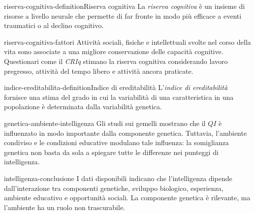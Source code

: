 \documentclass[preview]{standalone}
\begin{document}
\begin{snippetdefinition}{riserva-cognitiva-definition}{Riserva cognitiva}
    La \emph{riserva cognitiva} è un insieme di risorse a livello neurale che
    permette di far fronte in modo più efficace a eventi traumatici o al declino
    cognitivo.
\end{snippetdefinition}

\begin{snippet}{riserva-cognitiva-fattori}
    Attività sociali, fisiche e intellettuali svolte nel corso della vita sono
    associate a una migliore conservazione delle capacità cognitive. Questionari
    come il \emph{CRIq} stimano la riserva cognitiva considerando lavoro
    pregresso, attività del tempo libero e attività ancora praticate.
\end{snippet}

\begin{snippetdefinition}{indice-ereditabilita-definition}{Indice di ereditabilità}
    L'\emph{indice di ereditabilità} fornisce una stima del grado in cui la
    variabilità di una caratteristica in una popolazione è determinata dalla
    variabilità genetica.
\end{snippetdefinition}

\begin{snippet}{genetica-ambiente-intelligenza}
    Gli studi sui gemelli mostrano che il \(QI\) è influenzato in modo
    importante dalla componente genetica. Tuttavia, l'ambiente condiviso e le
    condizioni educative modulano tale influenza: la somiglianza genetica non
    basta da sola a spiegare tutte le differenze nei punteggi di intelligenza.
\end{snippet}


\begin{snippet}{intelligenza-conclusione}
    I dati disponibili indicano che l'intelligenza dipende dall'interazione tra
    componenti genetiche, sviluppo biologico, esperienza, ambiente educativo e
    opportunità sociali. La componente genetica è rilevante, ma l'ambiente ha un
    ruolo non trascurabile.
\end{snippet}
\end{document}
